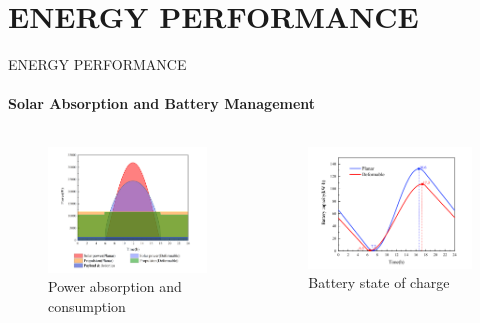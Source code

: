 \documentclass{beamer}
\begin{document}
\section{ENERGY PERFORMANCE} 
\begin{frame}{ENERGY PERFORMANCE}
    \framesubtitle{Solar Absorption and Battery Management}
    
    \begin{columns}
        \begin{column}{0.5\textwidth}
            \begin{figure}
                \centering
                \includegraphics[width=\textwidth]{power_curve.png}
                \caption{Power absorption and consumption}
            \end{figure}
        \end{column}
        \begin{column}{0.5\textwidth}
            \begin{figure}
                \centering
                \includegraphics[width=\textwidth]{soc_curve.png}
                \caption{Battery state of charge}
            \end{figure}
        \end{column}
    \end{columns}
\end{frame}
\end{document}
